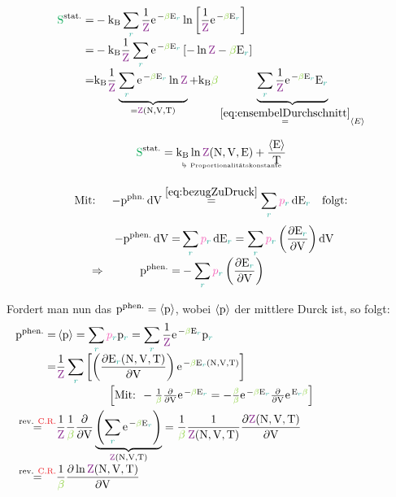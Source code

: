 \begin{sectionbox}\nospacing
  \begin{align*}
    \Spots=&-\kb\sum_{\idxr}\frac{1}{\Zz}\e^{-\betac\Ezr}\ln \left[\frac{1}{\Zz}\e^{-\betac\Ezr}\right]\nalign
    =&-\kb\frac{1}{\Zz}\sum_{\idxr}\e^{-\betac\Ezr}\left[-\ln\Zz-\betac\Ezr\right]\nalign
    =&\kb\frac{1}{\Zz}\underbrace{\sum_{\idxr}\e^{-\betac\Ezr}\ln\Zz}_{=\Zzk}+\kb\betac\underbrace{\sum_{\idxr}\frac{1}{\Zz}\e^{-\betac\Ezr}\Ezr}_{\eqs{\cref{eq:ensembelDurchschnitt}}\obs{E}}
  \end{align*}
\end{sectionbox}
\begin{defnbox}\nospacing
  \begin{defn}\label{defn:EntropieKanonisch}
    \begin{equation}
      \Spots=\bdra{\kb}{\normalfont{Proportionalitätskonstante}}\ln\Zzm+\frac{\obs{\Ez}}{\Tz}
    \end{equation}
  \end{defn}
\end{defnbox}
\begin{sectionbox}\label{subsec:BezugDruck}\nospacing
  \begin{align*}
    &\text{Mit: }&-\pz^{\text{phn.}}\diff\Vz\eqs{\cref{eq:bezugZuDruck}}\sum_{\idxr}\pbr\diff\Ezr&&\text{folgt:}
  \end{align*}
  \begin{align*}
    &&-\pzp\diff\Vz=&\sum_{\idxr}\pbr\diff\Ezr=\sum_{\idxr}\pbr\left(\pfrac{\Ezr}{\Vz}\right)\diff\Vz\nalign
    &\Rightarrow&\pzp=&-\sum_{\idxr}\pbr\left(\pfrac{\Ezr}{\Vz}\right)
  \end{align*}
\end{sectionbox}
\begin{sectionbox}\nospacing
  Fordert man nun das $\mathrm{p}^{\text{phen.}}=\left\langle\mathrm{p}\right\rangle$, wobei $\left\langle\mathrm{p}\right\rangle$ der mittlere Durck ist, so folgt:
  \begin{align*}
    \pzp=&\obs{\pz}=\sum_{\idxr}\pbr\pz_{\idxr}=\sum_{\idxr}\frac{1}{\Zz}\e^{-\betac\Ezr}\pz_{\idxr}\nalign
           =&\frac{1}{\Zz}\sum_{\idxr}\left[\left(\pfrac{\Ezr(\Nz,\Vz,\Tz)}{\Vz}\right)\e^{-\betac\Ezr(\Nz,\Vz,\Tz)}\right]\nalign
    \noalign{\centering 
    $\left[\text{Mit: } -\frac{1}{\betac}\frac{\partial}{\partial\Vz}\e^{-\betac\Ezr}=-\frac{\betac}{\betac}\e^{-\betac\Ezr}\frac{\partial}{\partial\Vz}\e^{\Ezr\betac}\right]$
    }
    \eqs{\text{rev. \rd{C.R.}}}&\frac{1}{\Zz}\frac{1}{\betac}\frac{\partial}{\partial\Vz}\underbrace{\left(\sum_{\idxr}\e^{-\betac\Ezr}\right)}_{\Zzk}=\frac{1}{\betac}\frac{1}{\Zzk}\pfrac{\Zzk}{\Vz}\nalign
                                 \eqs{\text{rev. \rd{C.R.}}}&\frac{1}{\betac}\pfrac{\ln\Zzk}{\Vz}
  \end{align*}
\end{sectionbox}
